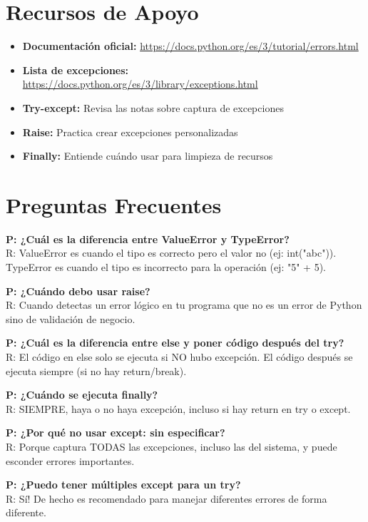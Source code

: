 \documentclass[12pt,a4paper]{article}
\begin{document}
\section{Recursos de Apoyo}

\begin{itemize}[leftmargin=*]
    \item \textbf{Documentación oficial:} \url{https://docs.python.org/es/3/tutorial/errors.html}
    \item \textbf{Lista de excepciones:} \url{https://docs.python.org/es/3/library/exceptions.html}
    \item \textbf{Try-except:} Revisa las notas sobre captura de excepciones
    \item \textbf{Raise:} Practica crear excepciones personalizadas
    \item \textbf{Finally:} Entiende cuándo usar para limpieza de recursos
\end{itemize}

\section{Preguntas Frecuentes}

\textbf{P: ¿Cuál es la diferencia entre ValueError y TypeError?}\\
R: ValueError es cuando el tipo es correcto pero el valor no (ej: int("abc")). TypeError es cuando el tipo es incorrecto para la operación (ej: "5" + 5).

\textbf{P: ¿Cuándo debo usar raise?}\\
R: Cuando detectas un error lógico en tu programa que no es un error de Python sino de validación de negocio.

\textbf{P: ¿Cuál es la diferencia entre else y poner código después del try?}\\
R: El código en else solo se ejecuta si NO hubo excepción. El código después se ejecuta siempre (si no hay return/break).

\textbf{P: ¿Cuándo se ejecuta finally?}\\
R: SIEMPRE, haya o no haya excepción, incluso si hay return en try o except.

\textbf{P: ¿Por qué no usar except: sin especificar?}\\
R: Porque captura TODAS las excepciones, incluso las del sistema, y puede esconder errores importantes.

\textbf{P: ¿Puedo tener múltiples except para un try?}\\
R: Sí! De hecho es recomendado para manejar diferentes errores de forma diferente.
\end{document}
